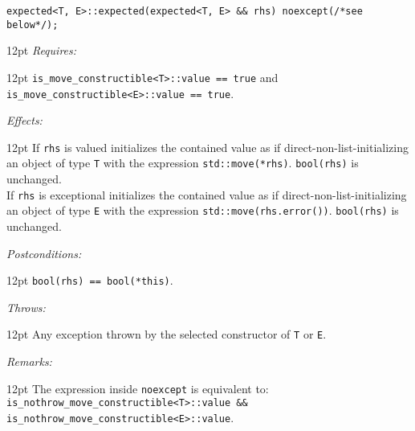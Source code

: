 \documentclass[a4paper,10pt]{article}
\newcommand{\cpp}[1]{\lstinline{#1}}
\newcommand{\wordingItem}[1]{\noindent\textit{#1:}}
\newenvironment{wordingTextItem}[1]{\wordingItem{#1}\vspace{7pt}\noindent\begin{adjustwidth}{12pt}{}}{\vspace{7pt}\end{adjustwidth}}
\newenvironment{wordingPara}{\begin{adjustwidth}{12pt}{}}{\end{adjustwidth}}
\begin{document}
\begin{lstlisting}[xleftmargin=0pt]
expected<T, E>::expected(expected<T, E> && rhs) noexcept(/*see below*/);
\end{lstlisting}
\begin{wordingPara}
\begin{wordingTextItem}{Requires}
\cpp{is_move_constructible<T>::value == true} and \\
\cpp{is_move_constructible<E>::value == true}.
\end{wordingTextItem}
\begin{wordingTextItem}{Effects}
If \cpp{rhs} is valued initializes the contained value as if direct-non-list-initializing an object of type \cpp{T} with the expression \cpp{std::move(*rhs)}. \cpp{bool(rhs)} is unchanged.\\

\noindent
If \cpp{rhs} is exceptional initializes the contained value as if direct-non-list-initializing an object of type \cpp{E} with the expression \cpp{std::move(rhs.error())}. \cpp{bool(rhs)} is unchanged.
\end{wordingTextItem}
\begin{wordingTextItem}{Postconditions}
\cpp{bool(rhs) == bool(*this)}.
\end{wordingTextItem}
\begin{wordingTextItem}{Throws}
Any exception thrown by the selected constructor of \cpp{T} or \cpp{E}.
\end{wordingTextItem}
\begin{wordingTextItem}{Remarks}
The expression inside \cpp{noexcept} is equivalent to:\\
\cpp{is_nothrow_move_constructible<T>::value && is_nothrow_move_constructible<E>::value}.
\end{wordingTextItem}
\end{wordingPara}
\end{document}
